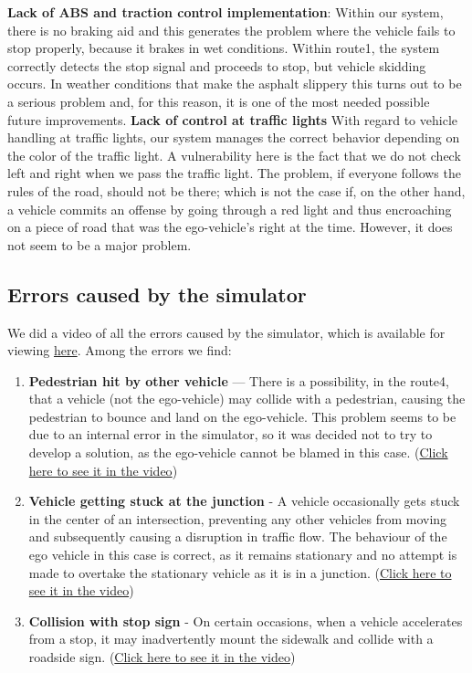 \documentclass{article}
\begin{document}
\textbf{Lack of ABS and traction control implementation}\label{ABS}: Within our system, there is no braking aid and this generates the 
problem where the vehicle fails to stop properly, because it brakes in wet conditions. 
Within route1, the system correctly detects the stop signal and proceeds to stop, but vehicle skidding occurs.
In weather conditions that make the asphalt slippery this turns out to be a serious problem and, for this reason, it is one 
of the most needed possible future improvements.
\textbf{Lack of control at traffic lights}
With regard to vehicle handling at traffic lights, our system manages the correct behavior depending on the color of the 
traffic light. A vulnerability here is the fact that we do not check left and right when we pass the traffic light. The problem, 
if everyone follows the rules of the road, should not be there; which is not the case if, on the other hand, a vehicle commits 
an offense by going through a red light and thus encroaching on a piece of road that was the ego-vehicle's right at the time.
However, it does not seem to be a major problem.

\subsection{Errors caused by the simulator}\label{simErr}
We did a video of all the errors caused by the simulator, which is available for viewing \href{https://youtu.be/0O9b3UihDAw}{here}.
Among the errors we find:
\begin{enumerate}
    \item \textbf{Pedestrian hit by other vehicle} — There is a possibility, in the route4, that a vehicle (not the ego-vehicle) 
    may collide with a pedestrian, causing the pedestrian to bounce and land on the ego-vehicle. This problem seems to be due to 
    an internal error in the simulator, so it was decided not to try to develop a solution, as the ego-vehicle cannot be blamed 
    in this case. (\href{https://youtu.be/0O9b3UihDAw?t=11}{Click here to see it in the video})
    \item \textbf{Vehicle getting stuck at the junction} - A vehicle occasionally gets stuck in the center of an intersection, 
    preventing any other vehicles from moving and subsequently causing a disruption in traffic flow.
    The behaviour of the ego vehicle in this case is correct, as it remains stationary and no attempt is made to overtake the 
    stationary vehicle as it is in a junction. (\href{https://youtu.be/0O9b3UihDAw?t=19}{Click here to see it in the video})
    \item \textbf{Collision with stop sign} - On certain occasions, when a vehicle accelerates from a stop, it may inadvertently 
    mount the sidewalk and collide with a roadside sign. (\href{https://youtu.be/0O9b3UihDAw?t=40}{Click here to see it in the video})
\end{enumerate}
\end{document}

